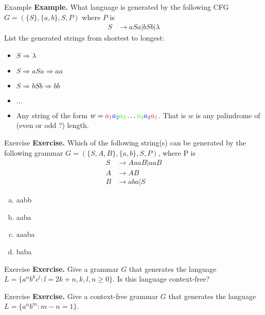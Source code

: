\documentclass[10pt]{beamer}
\begin{document}
\begin{frame}{Example}
    \textbf{Example.} What language is generated by the following CFG $G = (\{S\}, \{a,b\}, S, P)$ where $P$ is
    \begin{align*}
        S & \rightarrow aSa | bSb | \lambda
    \end{align*}
    List the generated strings from shortest to longest:
    \begin{itemize}
        \item $S \Rightarrow \lambda$
        \item $S \Rightarrow aSa \Rightarrow aa$
        \item $S \Rightarrow bSb \Rightarrow bb$
        \item $\dots$
        \item Any string of the form $w = \textcolor{red}{a_1} \textcolor{blue}{a_2} \textcolor{green}{a_3} \dots  \textcolor{green}{a_3} \textcolor{blue}{a_2} \textcolor{red}{a_1}$. That is $w$ is any palindrome of (even or odd ?) length.
    \end{itemize}
\end{frame}

\begin{frame}[t]{Exercise}
    \textbf{Exercise.} Which of the following string(s) can be generated by the following grammar $G = (\{S,A,B\}, \{a,b\}, S, P)$, where P is
    \begin{align*}
        S & \rightarrow AaaB | aaB \\
        A & \rightarrow AB         \\
        B & \rightarrow aba | S
    \end{align*}
    \begin{enumerate}[a.]
        \item aabb
        \item aaba
        \item aaaba
        \item baba
    \end{enumerate}
\end{frame}

\begin{frame}[t]{Exercise}
    \textbf{Exercise.} Give a grammar $G$ that generates the language $L = \{a^nb^kc^l : l = 2k + n, k,l,n \geq 0\}$. Is this language context-free?
\end{frame}

\begin{frame}[t]{Exercise}
    \textbf{Exercise.} Give a context-free grammar $G$ that generates the language $L = \{a^nb^m : m - n = 1\}$.
\end{frame}
\end{document}
